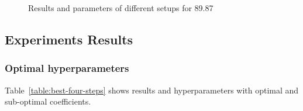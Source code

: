 \begin{figure}
    \caption{Results and parameters of different setups for 89.87}
    \label{fig:acc-iter}
\end{figure}

\subsection{Experiments Results}
\subsubsection{Optimal hyperparameters}

Table~\ref{table:best-four-steps} shows results and hyperparameters with optimal and sub-optimal coefficients.

